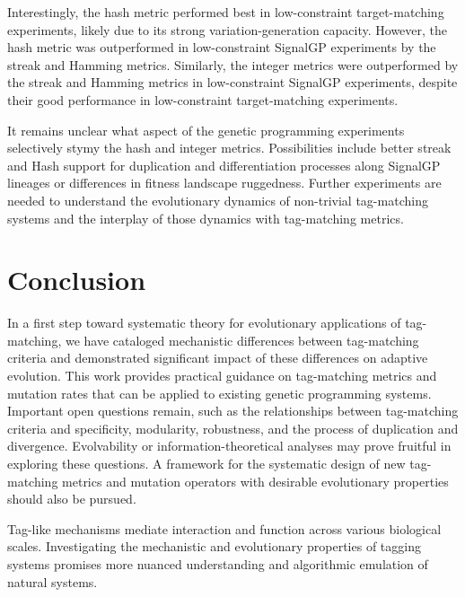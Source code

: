Interestingly, the hash metric performed best in low-constraint target-matching experiments, likely due to its strong variation-generation capacity.
However, the hash metric was outperformed in low-constraint SignalGP experiments by the streak and Hamming metrics.
Similarly, the integer metrics were outperformed by the streak and Hamming metrics in low-constraint SignalGP experiments, despite their good performance in low-constraint target-matching experiments.

It remains unclear what aspect of the genetic programming experiments selectively stymy the hash and integer metrics.
Possibilities include better streak and Hash support for duplication and differentiation processes along SignalGP lineages or differences in fitness landscape ruggedness.
Further experiments are needed to understand the evolutionary dynamics of non-trivial tag-matching systems and the interplay of those dynamics with tag-matching metrics.

\section{Conclusion}

In a first step toward systematic theory for evolutionary applications of tag-matching, we have cataloged mechanistic differences between tag-matching criteria and demonstrated significant impact of these differences on adaptive evolution.
This work provides practical guidance on tag-matching metrics and mutation rates that can be applied to existing genetic programming systems.
Important open questions remain, such as the relationships between tag-matching criteria and specificity, modularity, robustness, and the process of duplication and divergence.
Evolvability or information-theoretical analyses may prove fruitful in exploring these questions.
A framework for the systematic design of new tag-matching metrics and mutation operators with desirable evolutionary properties should also be pursued.

Tag-like mechanisms mediate interaction and function across various biological scales.
Investigating the mechanistic and evolutionary properties of tagging systems promises more nuanced understanding and algorithmic emulation of natural systems.
